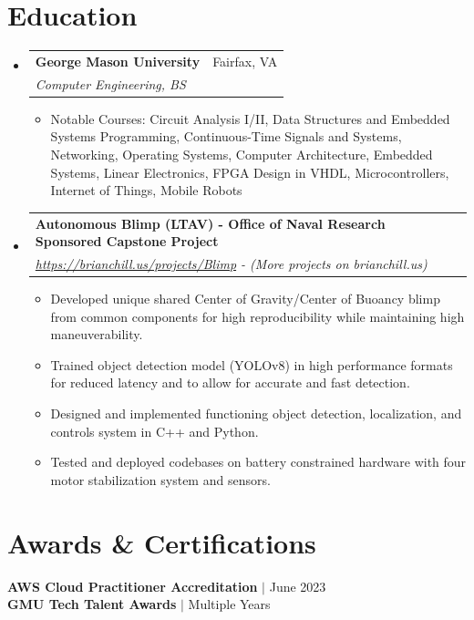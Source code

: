 \documentclass[letterpaper,11pt]{article}
\makeatletter
\newcommand{\resumeItem}[1]{
  \item\small{
    {#1 \vspace{-1pt}}
  }
}
\newcommand{\resumeSubheading}[4]{
  \vspace{-1pt}\item
    \begin{tabular*}{0.97\textwidth}[t]{l@{\extracolsep{\fill}}r}
      \textbf{#1} & #2 \\
      \textit{\small#3} & \textit{\small #4} \\
    \end{tabular*}\vspace{-5pt}
}
\newcommand{\resumeSubHeadingListStart}{\begin{itemize}[leftmargin=0.15in, label={}]}
\newcommand{\resumeSubHeadingListEnd}{\end{itemize}}
\newcommand{\resumeItemListStart}{\begin{itemize}}
\newcommand{\resumeItemListEnd}{\end{itemize}\vspace{-5pt}}
\makeatother
\begin{document}
\section{Education}
  \resumeSubHeadingListStart
    \resumeSubheading
      {George Mason University}{Fairfax, VA}
      {Computer Engineering, BS}{}
          \resumeItemListStart
            \resumeItem{Notable Courses: Circuit Analysis I/II, Data Structures and Embedded Systems Programming, Continuous-Time Signals and Systems, 
            Networking, Operating Systems, Computer Architecture, Embedded Systems, Linear Electronics, FPGA Design in VHDL, Microcontrollers, 
            Internet of Things, Mobile Robots}
            
        \resumeItemListEnd

    \resumeSubheading
      {Autonomous Blimp (LTAV) - Office of Naval Research Sponsored Capstone Project}{}
      {\href{https://brianchill.us/projects/Blimp}{https://brianchill.us/projects/Blimp} - (More projects on brianchill.us)}{}
      \resumeItemListStart
        \resumeItem{Developed unique shared Center of Gravity/Center of Buoancy blimp from common components for high reproducibility while maintaining high maneuverability.}
        \resumeItem{Trained object detection model (YOLOv8) in high performance formats for reduced latency and to allow for accurate and fast detection.}
        \resumeItem{Designed and implemented functioning object detection, localization, and controls system in C++ and Python.}
        \resumeItem{Tested and deployed codebases on battery constrained hardware with four motor stabilization system and sensors.}
            
        \resumeItemListEnd

  \resumeSubHeadingListEnd

\section{Awards \& Certifications}
 \begin{itemize}[leftmargin=0.15in, label={}]
    \small{\item{
     {\textbf{AWS Cloud Practitioner Accreditation} $|$ {June 2023}} \\ 
     {\textbf{GMU Tech Talent Awards} $|$ {Multiple Years}}
    }}
 \end{itemize}


\end{document}
